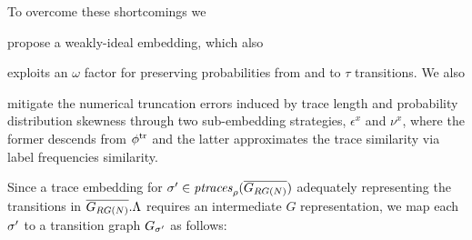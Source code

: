 {To overcome these shortcomings we} \begin{alphalist} \item propose a weakly-ideal embedding, which also \item exploits an
$\omega$ factor for preserving probabilities from and to $\tau$ transitions. We also \item mitigate the
numerical truncation errors induced by trace length and probability distribution skewness through two sub-embedding strategies,
$\epsilon^x$ and $\nu^x$, where the former descends from $\trembed$ and the latter approximates the trace similarity via label frequencies similarity.
\end{alphalist}

Since a trace embedding for $\nonlogtrace\in\WCal{\pmin}{n}$ adequately representing the transitions in $\expN.\Lambda$ requires an intermediate $G$ representation, we map each $\nonlogtrace$ to a transition graph $\tg_\nonlogtrace$ as follows:
